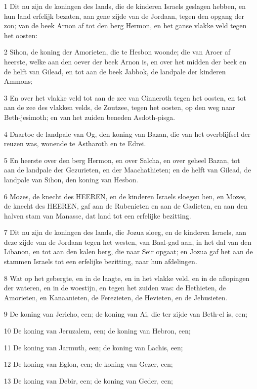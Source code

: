 \par 1 Dit nu zijn de koningen des lands, die de kinderen Israels geslagen hebben, en hun land erfelijk bezaten, aan gene zijde van de Jordaan, tegen den opgang der zon; van de beek Arnon af tot den berg Hermon, en het ganse vlakke veld tegen het oosten:
\par 2 Sihon, de koning der Amorieten, die te Hesbon woonde; die van Aroer af heerste, welke aan den oever der beek Arnon is, en over het midden der beek en de helft van Gilead, en tot aan de beek Jabbok, de landpale der kinderen Ammons;
\par 3 En over het vlakke veld tot aan de zee van Cinneroth tegen het oosten, en tot aan de zee des vlakken velds, de Zoutzee, tegen het oosten, op den weg naar Beth-jesimoth; en van het zuiden beneden Asdoth-pisga.
\par 4 Daartoe de landpale van Og, den koning van Bazan, die van het overblijfsel der reuzen was, wonende te Astharoth en te Edrei.
\par 5 En heerste over den berg Hermon, en over Salcha, en over geheel Bazan, tot aan de landpale der Gezurieten, en der Maachathieten; en de helft van Gilead, de landpale van Sihon, den koning van Hesbon.
\par 6 Mozes, de knecht des HEEREN, en de kinderen Israels sloegen hen, en Mozes, de knecht des HEEREN, gaf aan de Rubenieten en aan de Gadieten, en aan den halven stam van Manasse, dat land tot een erfelijke bezitting.
\par 7 Dit nu zijn de koningen des lands, die Jozua sloeg, en de kinderen Israels, aan deze zijde van de Jordaan tegen het westen, van Baal-gad aan, in het dal van den Libanon, en tot aan den kalen berg, die naar Seir opgaat; en Jozua gaf het aan de stammen Israels tot een erfelijke bezitting, naar hun afdelingen.
\par 8 Wat op het gebergte, en in de laagte, en in het vlakke veld, en in de aflopingen der wateren, en in de woestijn, en tegen het zuiden was: de Hethieten, de Amorieten, en Kanaanieten, de Ferezieten, de Hevieten, en de Jebusieten.
\par 9 De koning van Jericho, een; de koning van Ai, die ter zijde van Beth-el is, een;
\par 10 De koning van Jeruzalem, een; de koning van Hebron, een;
\par 11 De koning van Jarmuth, een; de koning van Lachis, een;
\par 12 De koning van Eglon, een; de koning van Gezer, een;
\par 13 De koning van Debir, een; de koning van Geder, een;
